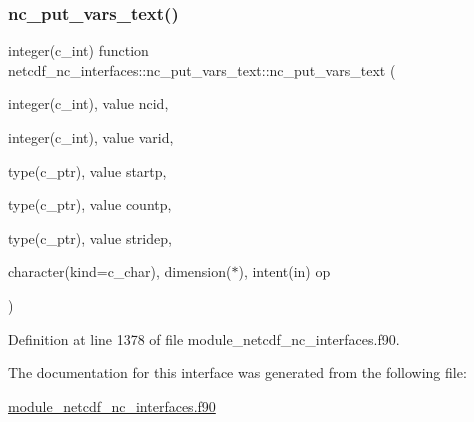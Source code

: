 \subsubsection{\texorpdfstring{nc\+\_\+put\+\_\+vars\+\_\+text()}{nc\_put\_vars\_text()}}
{\footnotesize\ttfamily integer(c\+\_\+int) function netcdf\+\_\+nc\+\_\+interfaces\+::nc\+\_\+put\+\_\+vars\+\_\+text\+::nc\+\_\+put\+\_\+vars\+\_\+text (\begin{DoxyParamCaption}\item[{integer(c\+\_\+int), value}]{ncid,  }\item[{integer(c\+\_\+int), value}]{varid,  }\item[{type(c\+\_\+ptr), value}]{startp,  }\item[{type(c\+\_\+ptr), value}]{countp,  }\item[{type(c\+\_\+ptr), value}]{stridep,  }\item[{character(kind=c\+\_\+char), dimension($\ast$), intent(in)}]{op }\end{DoxyParamCaption})}



Definition at line 1378 of file module\+\_\+netcdf\+\_\+nc\+\_\+interfaces.\+f90.



The documentation for this interface was generated from the following file\+:\begin{DoxyCompactItemize}
\item 
\hyperlink{module__netcdf__nc__interfaces_8f90}{module\+\_\+netcdf\+\_\+nc\+\_\+interfaces.\+f90}\end{DoxyCompactItemize}
